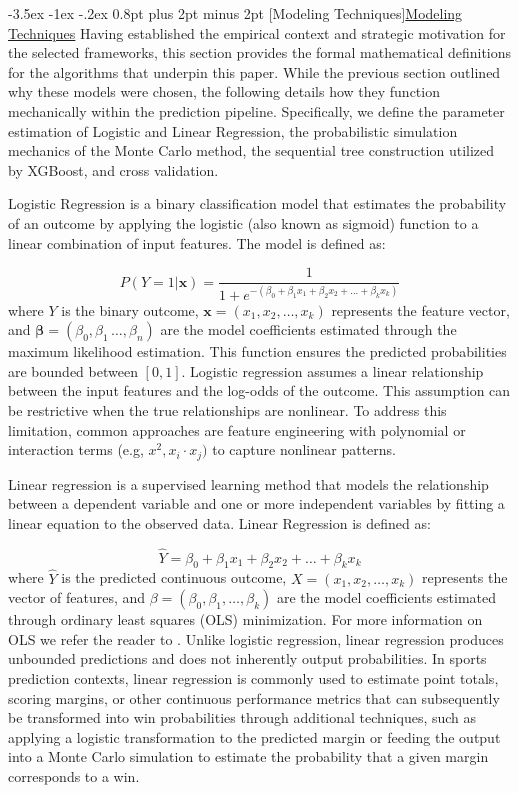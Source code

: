 \documentclass[12pt,leqno]{article}\usepackage[pdftex]{graphicx}\usepackage[dvipsnames]{xcolor}
\makeatletter
\renewcommand\subsection{\@startsection {subsection}{1}{\z@}%
{-3.5ex \@plus -1ex \@minus -.2ex}%
{0.8pt plus 2pt minus 2pt}%
{\normalfont}}
\newcommand{\usubsection}[1]{\subsection[#1]{\centering\normalfont\underline{#1}}}%
\theoremstyle{remark}
\makeatother
\begin{document}
\usubsection{Modeling Techniques}
Having established the empirical context and strategic motivation for the selected frameworks, this section provides the formal mathematical definitions for the algorithms that underpin this paper. While the previous section outlined why these models were chosen, the following details how they function mechanically within the prediction pipeline. Specifically, we define the parameter estimation of Logistic and Linear Regression, the probabilistic simulation mechanics of the Monte Carlo method, the sequential tree construction utilized by XGBoost, and cross validation.

Logistic Regression is a binary classification model that estimates the probability of an outcome by applying the logistic (also known as sigmoid) function to a linear combination of input features. The model is defined as:

\begin{equation}
P(Y=1|\mathbf{x}) = \frac{1}{1 + e^{-(\beta_0 + \beta_1 x_1 + \beta_2 x_2 + ... + \beta_k x_k)}}
\end{equation}
where $Y$ is the binary outcome, $\mathbf{x} = (x_1,x_2,\ldots,x_k)$ represents the feature vector, and $\boldsymbol{\beta} = (\beta_0,\beta_1\, \ldots, \beta_n)$ are the model coefficients estimated through the maximum likelihood estimation. This function ensures the predicted probabilities are bounded between $[0,1]$. Logistic regression assumes a linear relationship between the input features and the log-odds of the outcome. This assumption can be restrictive when the true relationships are nonlinear. To address this limitation, common approaches are feature engineering with polynomial or interaction terms (e.g, $x^2, x_i \cdot x_j)$ to capture nonlinear patterns. 

Linear regression is a supervised learning method that models the relationship between a dependent variable and one or more independent variables by fitting a linear equation to the observed data. Linear Regression is defined as:

\begin{equation}
\hat{Y} = \beta_0 + \beta_1 x_1 + \beta_2 x_2 + \ldots + \beta_k x_k
\end{equation}
where $\hat{Y}$ is the predicted continuous outcome, $X = (x_1, x_2, \ldots, x_k)$ represents the vector of features, and $\beta = (\beta_0, \beta_1, \ldots, \beta_k)$ are the model coefficients estimated through ordinary least squares (OLS) minimization. For more information on OLS we refer the reader to \cite{OLS}. Unlike logistic regression, linear regression produces unbounded predictions and does not inherently output probabilities. In sports prediction contexts, linear regression is commonly used to estimate point totals, scoring margins, or other continuous performance metrics that can subsequently be transformed into win probabilities through additional techniques, such as applying a logistic transformation to the predicted margin or feeding the output into a Monte Carlo simulation to estimate the probability that a given margin corresponds to a win.
\end{document}
